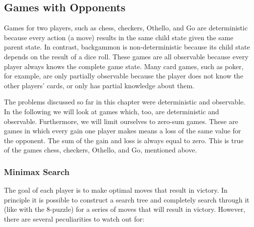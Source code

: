 \documentclass[10pt]{article}
\begin{document}
\subsection*{Games with Opponents}
Games for two players, such as chess, checkers, Othello, and Go are deterministic because every action (a move) results in the same child state given the same parent state. In contrast, backgammon is non-deterministic because its child state depends on the result of a dice roll. These games are all observable because every player always knows the complete game state. Many card games, such as poker, for example, are only partially observable because the player does not know the other players' cards, or only has partial knowledge about them.

The problems discussed so far in this chapter were deterministic and observable. In the following we will look at games which, too, are deterministic and observable. Furthermore, we will limit ourselves to zero-sum games. These are games in which every gain one player makes means a loss of the same value for the opponent. The sum of the gain and loss is always equal to zero. This is true of the games chess, checkers, Othello, and Go, mentioned above.

\subsubsection*{Minimax Search}
The goal of each player is to make optimal moves that result in victory. In principle it is possible to construct a search tree and completely search through it (like with the 8-puzzle) for a series of moves that will result in victory. However, there are several peculiarities to watch out for:
\end{document}

